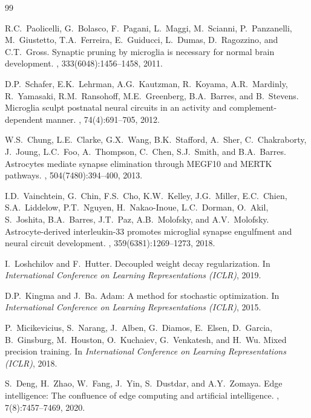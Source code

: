 \documentclass[letterpaper]{article} %
\begin{document}
\begin{thebibliography}{99}

R.C.~Paolicelli, G.~Bolasco, F.~Pagani, L.~Maggi, M.~Scianni, P.~Panzanelli, M.~Giustetto, T.A.~Ferreira, E.~Guiducci, L.~Dumas, D.~Ragozzino, and C.T.~Gross.
\newblock Synaptic pruning by microglia is necessary for normal brain development.
, 333(6048):1456--1458, 2011.

D.P.~Schafer, E.K.~Lehrman, A.G.~Kautzman, R.~Koyama, A.R.~Mardinly, R.~Yamasaki, R.M.~Ransohoff, M.E.~Greenberg, B.A.~Barres, and B.~Stevens.
\newblock Microglia sculpt postnatal neural circuits in an activity and complement-dependent manner.
, 74(4):691--705, 2012.

W.S.~Chung, L.E.~Clarke, G.X.~Wang, B.K.~Stafford, A.~Sher, C.~Chakraborty, J.~Joung, L.C.~Foo, A.~Thompson, C.~Chen, S.J.~Smith, and B.A.~Barres.
\newblock Astrocytes mediate synapse elimination through MEGF10 and MERTK pathways.
, 504(7480):394--400, 2013.

I.D.~Vainchtein, G.~Chin, F.S.~Cho, K.W.~Kelley, J.G.~Miller, E.C.~Chien, S.A.~Liddelow, P.T.~Nguyen, H.~Nakao-Inoue, L.C.~Dorman, O.~Akil, S.~Joshita, B.A.~Barres, J.T.~Paz, A.B.~Molofsky, and A.V.~Molofsky.
\newblock Astrocyte-derived interleukin-33 promotes microglial synapse engulfment and neural circuit development.
, 359(6381):1269--1273, 2018.


I.~Loshchilov and F.~Hutter.
\newblock Decoupled weight decay regularization.
\newblock In {\em International Conference on Learning Representations (ICLR)}, 2019.

D.P.~Kingma and J.~Ba.
\newblock Adam: A method for stochastic optimization.
\newblock In {\em International Conference on Learning Representations (ICLR)}, 2015.

P.~Micikevicius, S.~Narang, J.~Alben, G.~Diamos, E.~Elsen, D.~Garcia, B.~Ginsburg, M.~Houston, O.~Kuchaiev, G.~Venkatesh, and H.~Wu.
\newblock Mixed precision training.
\newblock In {\em International Conference on Learning Representations (ICLR)}, 2018.


S.~Deng, H.~Zhao, W.~Fang, J.~Yin, S.~Dustdar, and A.Y.~Zomaya.
\newblock Edge intelligence: The confluence of edge computing and artificial intelligence.
, 7(8):7457--7469, 2020.


\end{thebibliography}
\end{document}
